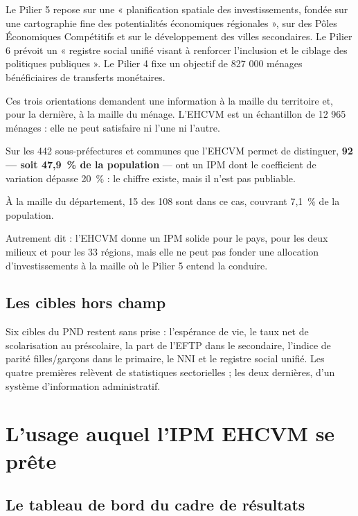 \documentclass[11pt,a4paper]{article}
\begin{document}
Le Pilier 5 repose sur une « planification spatiale des investissements, fondée sur une
cartographie fine des potentialités économiques régionales », sur des Pôles Économiques Compétitifs
et sur le développement des villes secondaires. Le Pilier 6 prévoit un « registre social unifié
visant à renforcer l'inclusion et le ciblage des politiques publiques ». Le Pilier 4 fixe un
objectif de 827 000 ménages bénéficiaires de transferts monétaires.

Ces trois orientations demandent une information à la maille du territoire et, pour la dernière, à
la maille du ménage. L'EHCVM est un échantillon de 12 965 ménages : elle ne peut satisfaire ni
l'une ni l'autre.

\begin{attention}
Sur les 442 sous-préfectures et communes que l'EHCVM permet de distinguer, \textbf{92 --- soit
47,9~\% de la population} --- ont un IPM dont le coefficient de variation dépasse 20~\% : le
chiffre existe, mais il n'est pas publiable.

À la maille du département, 15 des 108 sont dans ce cas, couvrant 7,1~\% de la population.

Autrement dit : l'EHCVM donne un IPM solide pour le pays, pour les deux milieux et pour les 33
régions, mais elle ne peut pas fonder une allocation d'investissements à la maille où le Pilier 5
entend la conduire.
\end{attention}

\subsection{Les cibles hors champ}

Six cibles du PND restent sans prise : l'espérance de vie, le taux net de scolarisation au
préscolaire, la part de l'EFTP dans le secondaire, l'indice de parité filles/garçons dans le
primaire, le NNI et le registre social unifié. Les quatre premières relèvent de statistiques
sectorielles ; les deux dernières, d'un système d'information administratif.

\section{L'usage auquel l'IPM EHCVM se prête}

\subsection{Le tableau de bord du cadre de résultats}
\end{document}

